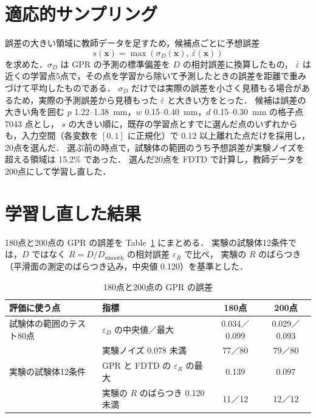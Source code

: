 \documentclass{jarticle}
\begin{document}
\section{適応的サンプリング}
誤差の大きい領域に教師データを足すため，候補点ごとに予想誤差
\begin{equation}
 s(\boldsymbol{x}) = \max \left( \sigma_D(\boldsymbol{x}),\ \bar{\varepsilon}(\boldsymbol{x}) \right)
\end{equation}
を求めた．$\sigma_D$ は GPR の予測の標準偏差を $D$ の相対誤差に換算したもの，
$\bar{\varepsilon}$ は近くの学習点5点で，その点を学習から除いて予測したときの誤差を距離で重みづけて平均したものである．
$\sigma_D$ だけでは実際の誤差を小さく見積もる場合があるため，実際の予測誤差から見積もった $\bar{\varepsilon}$ と大きい方をとった．
候補は誤差の大きい角を囲む $p$ 1.22--1.38~mm，$w$ 0.15--0.40~mm，$d$ 0.15--0.30~mm の格子点 7043 点とし，
$s$ の大きい順に，既存の学習点とすでに選んだ点のいずれからも，入力空間（各変数を $[0,1]$ に正規化）で 0.12 以上離れた点だけを採用し，20点を選んだ．
選ぶ前の時点で，試験体の範囲のうち予想誤差が実験ノイズを超える領域は 15.2\% であった．
選んだ20点を FDTD で計算し，教師データを200点にして学習し直した．

\section{学習し直した結果}
180点と200点の GPR の誤差を Table~\ref{tab:retrain} にまとめる．
実験の試験体12条件では，$D$ ではなく $R = D / D_{\mathrm{smooth}}$ の相対誤差 $\varepsilon_R$ で比べ，
実験の $R$ のばらつき（平滑面の測定のばらつき込み，中央値 0.120）を基準とした．

\begin{table}[H]
 \centering
 \caption{180点と200点の GPR の誤差}
 \label{tab:retrain}
 \begin{tabular}{llcc} \hline
  評価に使う点 & 指標 & 180点 & 200点 \\ \hline
  試験体の範囲のテスト80点 & $\varepsilon_D$ の中央値／最大 & 0.034／0.099 & 0.029／0.093 \\
                         & 実験ノイズ 0.078 未満 & 77／80 & 79／80 \\
  実験の試験体12条件       & GPR と FDTD の $\varepsilon_R$ の最大 & 0.139 & 0.097 \\
                         & 実験の $R$ のばらつき 0.120 未満 & 11／12 & 12／12 \\ \hline
 \end{tabular}
\end{table}
\end{document}
